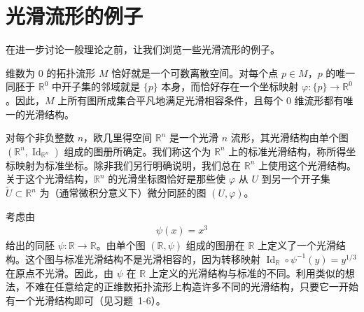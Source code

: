 \documentclass[../../main.tex]{subfiles}
\begin{document}
\section{光滑流形的例子}\label{section:ch01-光滑流形的例子}

在进一步讨论一般理论之前，让我们浏览一些光滑流形的例子。

\begin{example}[$0$ 维流形]\label{example:ch01-0维流形}
维数为 $0$ 的拓扑流形 $M$ 恰好就是一个可数离散空间。对每个点 $p\in M$，$p$ 的唯一同胚于 $\mathbb{R}^{0}$ 中开子集的邻域就是 $\{p\}$ 本身，而恰好存在一个坐标映射 $\varphi:\{p\}\to\mathbb{R}^{0}$。因此，$M$ 上所有图所成集合平凡地满足光滑相容条件，且每个 $0$ 维流形都有唯一的光滑结构。
\end{example}

\begin{example}[欧几里得空间]\label{example:ch01-欧几里得空间}
对每个非负整数 $n$，欧几里得空间 $\mathbb{R}^{n}$ 是一个光滑 $n$ 流形，其光滑结构由单个图 $(\mathbb{R}^{n},\operatorname{Id}_{\mathbb{R}^{n}})$ 组成的图册所确定。我们称这个为 $\mathbb{R}^{n}$ 上的标准光滑结构，称所得坐标映射为标准坐标。除非我们另行明确说明，我们总在 $\mathbb{R}^{n}$ 上使用这个光滑结构。关于这个光滑结构，$\mathbb{R}^{n}$ 的光滑坐标图恰好是那些使 $\varphi$ 从 $U$ 到另一个开子集 $\widetilde{U}\subset\mathbb{R}^{n}$ 为（通常微积分意义下）微分同胚的图 $(U,\varphi)$。
\end{example}

\begin{example}\label{example:ch01-另一光滑结构}
考虑由
\begin{align}
\psi(x)=x^{3}\label{align:ch01-另一光滑结构}
\end{align}
给出的同胚 $\psi:\mathbb{R}\to\mathbb{R}$。由单个图 $(\mathbb{R},\psi)$ 组成的图册在 $\mathbb{R}$ 上定义了一个光滑结构。这个图与标准光滑结构不是光滑相容的，因为转移映射 $\operatorname{Id}_{\mathbb{R}}\circ\psi^{-1}(y)=y^{1/3}$ 在原点不光滑。因此，由 $\psi$ 在 $\mathbb{R}$ 上定义的光滑结构与标准的不同。利用类似的想法，不难在任意给定的正维数拓扑流形上构造许多不同的光滑结构，只要它一开始有一个光滑结构即可（见习题~1-6）。
\end{example}
\end{document}
